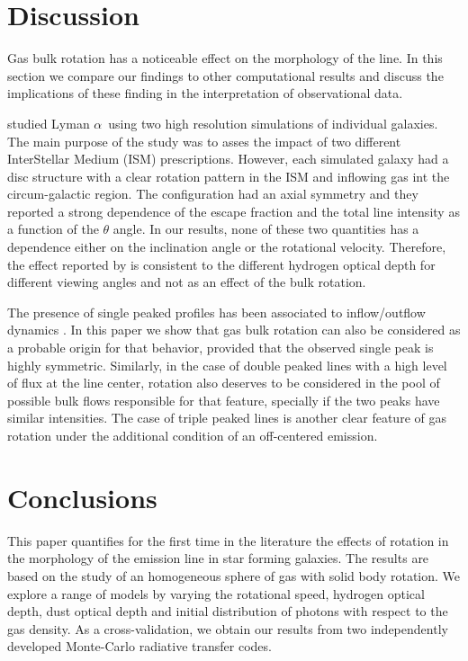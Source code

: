 \documentclass{emulateapj}
\newcommand{\ly}{{\ifmmode{{\rm Ly}\alpha~}\else{Ly$\alpha$~}\fi}}
\newcommand{\lya}{{Lyman $\alpha$~}}
\begin{document}
\section{Discussion}
\label{sec:discussion}

Gas bulk rotation has a noticeable effect on the morphology of the
 \ly line. In this section we compare our findings to other
 computational results and discuss the implications of these finding
 in the interpretation of observational data.


\cite{Verhamme12} studied \lya using two high resolution simulations
of individual galaxies. The main purpose of the study was to asses the
impact of two different InterStellar Medium (ISM) prescriptions. However, each simulated
galaxy had a disc structure with a clear rotation pattern in the ISM
and inflowing gas int the circum-galactic region. The configuration
had an axial symmetry and they reported a strong dependence of the
escape fraction and the total line intensity as a function of the
$\theta$ angle. In our results, none of these two quantities has a
dependence either on the inclination angle or the rotational
velocity. Therefore, the effect reported by \cite{Verhamme} is
consistent to the different hydrogen optical depth for different
viewing angles and not as an effect of the bulk rotation. 

The presence of single peaked profiles has been associated to
inflow/outflow dynamics \citep{Verhamme06,DijkstraKramer}. In this
paper we show that gas bulk rotation can also be considered as a
probable origin for that behavior, provided that the observed single peak is highly
symmetric. Similarly, in the case of double peaked lines with a high
level of flux at the line center, rotation also deserves to be considered in
the pool of possible bulk flows responsible for that feature,
specially if the two peaks have similar intensities. The case of
triple peaked lines is another clear feature of gas rotation under the
additional condition of an off-centered emission. 

\section{Conclusions}
\label{sec:conclusions}

This paper quantifies for the first time in the literature the effects
of rotation in the morphology of the \ly emission line in star forming
galaxies.  The results are based on the study of an homogeneous sphere
of gas with solid body rotation. We explore a range of models by varying
the rotational speed, hydrogen optical depth, dust optical depth and
initial distribution of \ly photons with respect to the gas
density. As a cross-validation, we obtain our results from two
independently developed Monte-Carlo radiative transfer codes. 
\end{document}
